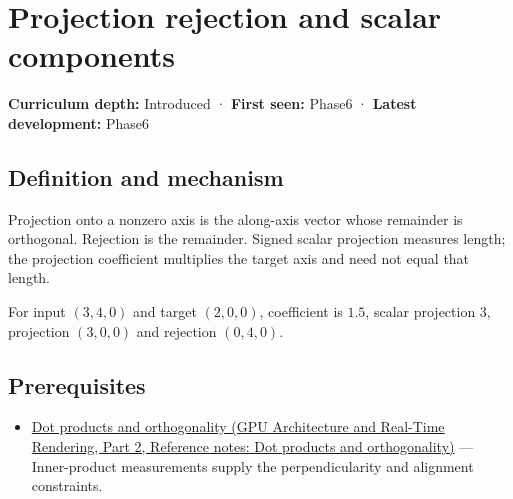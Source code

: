 \hypertarget{appendix-505a502c372a}{}\label{referencestart:appendix-505a502c372a}
\section{Projection rejection and scalar components}\label{appendix-505a502c372a-projection-rejection-and-scalar-components}

\hypertarget{appendix-505a502c372a-projection-rejection-and-scalar-components}{}

\textbf{Curriculum depth:} Introduced · \textbf{First seen:} Phase6 · \textbf{Latest development:} Phase6

\begin{allmightroledefinition}

\subsection{Definition and mechanism}\label{appendix-505a502c372a-definition-and-mechanism}

\hypertarget{appendix-505a502c372a-definition-and-mechanism}{}

Projection onto a nonzero axis is the along-axis vector whose remainder is orthogonal. Rejection is the remainder. Signed scalar projection measures length; the projection coefficient multiplies the target axis and need not equal that length.

\end{allmightroledefinition}

For input \((3,4,0)\) and target \((2,0,0)\), coefficient is \(1.5\), scalar projection \(3\), projection \((3,0,0)\) and rejection \((0,4,0)\).

\subsection{Prerequisites}\label{appendix-505a502c372a-prerequisites}

\hypertarget{appendix-505a502c372a-prerequisites}{}

\begin{itemize}
\tightlist
\item
  \href{../06-GPU-Architecture-and-Real-Time-Rendering-P02/main.pdf\#appendix-8bc4e8fc547c}{Dot products and orthogonality (GPU Architecture and Real-Time Rendering, Part 2, Reference notes: Dot products and orthogonality)} --- Inner-product measurements supply the perpendicularity and alignment constraints.
\end{itemize}


